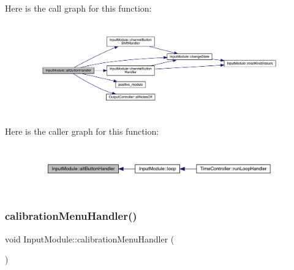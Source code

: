 Here is the call graph for this function\+:
\nopagebreak
\begin{figure}[H]
\begin{center}
\leavevmode
\includegraphics[width=350pt]{class_input_module_a1f93d0b1fc3269147f4d03a888ddb631_cgraph}
\end{center}
\end{figure}
Here is the caller graph for this function\+:
\nopagebreak
\begin{figure}[H]
\begin{center}
\leavevmode
\includegraphics[width=350pt]{class_input_module_a1f93d0b1fc3269147f4d03a888ddb631_icgraph}
\end{center}
\end{figure}
\mbox{\label{class_input_module_a75dd14eb87936e206ba74ca406851201}} 
\subsubsection{\texorpdfstring{calibration\+Menu\+Handler()}{calibrationMenuHandler()}}
{\footnotesize\ttfamily void Input\+Module\+::calibration\+Menu\+Handler (\begin{DoxyParamCaption}{ }\end{DoxyParamCaption})}

